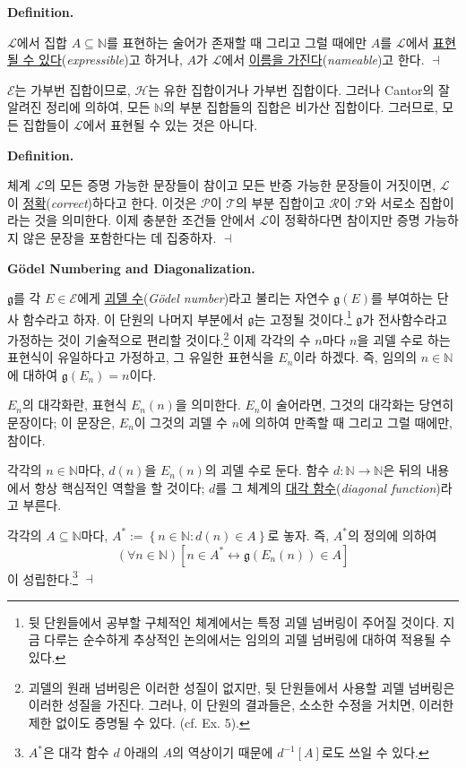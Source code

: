 \documentclass[12pt]{paper}
\newcommand{\gnum}
{ \mathfrak{g} }
\newenvironment{context}[1][]
{ \noindent \textbf{{#1}.}
}
{ \hfill $ \dashv $ }
\begin{document}
\begin{context}[Definition]
$\mathcal{L}$에서 집합 $A \subseteq \mathbb{N}$를 표현하는 술어가 존재할 때 그리고 그럴 때에만
$A$를 $\mathcal{L}$에서 \underline{표현될 수 있다}(\textit{expressible})고 하거나,
$A$가 $\mathcal{L}$에서 \underline{이름을 가진다}(\textit{nameable})고 한다.
\end{context}

$\mathcal{E}$는 가부번 집합이므로,
$\mathcal{H}$는 유한 집합이거나 가부번 집합이다.
그러나 Cantor의 잘 알려진 정리에 의하여,
모든 $\mathbb{N}$의 부분 집합들의 집합은 비가산 집합이다.
그러므로, 모든 집합들이 $\mathcal{L}$에서 표현될 수 있는 것은 아니다.

\begin{context}[Definition]
체계 $\mathcal{L}$의 모든 증명 가능한 문장들이 참이고 모든 반증 가능한 문장들이 거짓이면,
$\mathcal{L}$이 \underline{정확}(\textit{correct})하다고 한다.
이것은 $\mathcal{P}$이 $\mathcal{T}$의 부분 집합이고 $\mathcal{R}$이 $\mathcal{T}$와 서로소 집합이라는 것을 의미한다.
이제 충분한 조건들 안에서 $\mathcal{L}$이 정확하다면 참이지만 증명 가능하지 않은 문장을 포함한다는 데 집중하자.
\end{context}

\begin{context}[G\"odel Numbering and Diagonalization]
$\gnum$를 각 $E \in \mathcal{E}$에게 \underline{괴델 수}(\textit{G\"odel number})라고 불리는 자연수 $\gnum \left( E \right)$를 부여하는 단사 함수라고 하자.
이 단원의 나머지 부분에서 $\gnum$는 고정될 것이다.\footnote
{
뒷 단원들에서 공부할 구체적인 체계에서는 특정 괴델 넘버링이 주어질 것이다.
지금 다루는 순수하게 추상적인 논의에서는 임의의 괴델 넘버링에 대하여 적용될 수 있다.
}
$\gnum$가 전사함수라고 가정하는 것이 기술적으로 편리할 것이다.\footnote
{
괴델의 원래 넘버링은 이러한 성질이 없지만,
뒷 단원들에서 사용할 괴델 넘버링은 이러한 성질을 가진다.
그러나, 이 단원의 결과들은, 소소한 수정을 거치면,
이러한 제한 없이도 증명될 수 있다.
(cf. Ex. 5).
}
이제 각각의 수 $n$마다 $n$을 괴델 수로 하는 표현식이 유일하다고 가정하고,
그 유일한 표현식을 $E_{n}$이라 하겠다.
즉, 임의의 $n \in \mathbb{N}$에 대하여 $\gnum \left( E_{n} \right) = n$이다.

$E_{n}$의 대각화란, 표현식 $E_{n} \left( n \right)$을 의미한다.
$E_{n}$이 술어라면, 그것의 대각화는 당연히 문장이다;
이 문장은, $E_{n}$이 그것의 괴델 수 $n$에 의하여 만족할 때 그리고 그럴 때에만, 참이다.

각각의 $n \in \mathbb{N}$마다, $d \left( n \right)$을 $E_{n} \left( n \right)$의 괴델 수로 둔다.
함수 $d : \mathbb{N} \to \mathbb{N}$은 뒤의 내용에서 항상 핵심적인 역할을 할 것이다;
$d$를 그 체계의 \underline{대각 함수}(\textit{diagonal function})라고 부른다.

각각의 $A \subseteq \mathbb{N}$마다, $A^{*} := \left\{ n \in \mathbb{N} : d \left( n \right) \in A \right\} $로 놓자.
즉, $A^{*}$의 정의에 의하여 $$ \left( \forall n \in \mathbb{N} \right) \left[ n \in A^{*} \leftrightarrow \gnum \left( E_{n} \left( n \right) \right) \in A \right] $$이 성립한다.\footnote
{
$A^{*}$은 대각 함수 $d$ 아래의 $A$의 역상이기 때문에 $d^{-1} \left[ A \right]$로도 쓰일 수 있다.
}
\end{context}
\end{document}
